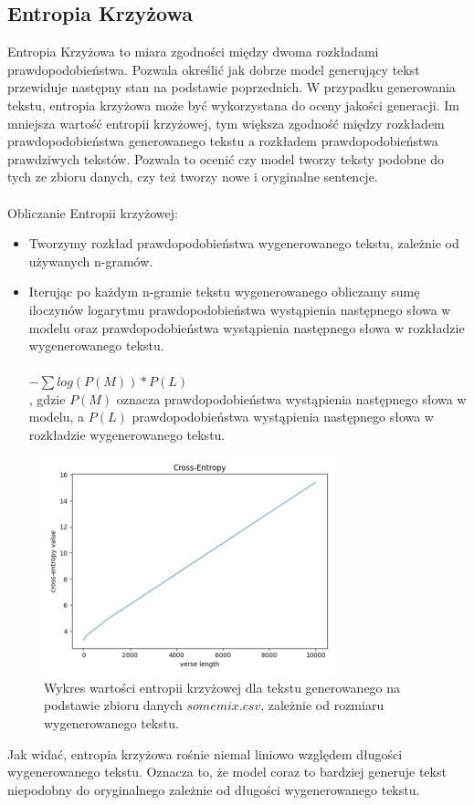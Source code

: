 \documentclass{article}
\begin{document}
\subsection{Entropia Krzyżowa}
Entropia Krzyżowa to miara zgodności między dwoma rozkładami prawdopodobieństwa. Pozwala określić jak dobrze model generujący tekst przewiduje następny stan na podstawie poprzednich. W przypadku generowania tekstu, entropia krzyżowa może być wykorzystana do oceny jakości generacji. Im mniejsza wartość entropii krzyżowej, tym większa zgodność między rozkładem prawdopodobieństwa generowanego tekstu a rozkładem prawdopodobieństwa prawdziwych tekstów. Pozwala to ocenić czy model tworzy teksty podobne do tych ze zbioru danych, czy też tworzy nowe i oryginalne sentencje.
\\\\
Obliczanie Entropii krzyżowej:
\begin{itemize}
    \item Tworzymy rozkład prawdopodobieństwa wygenerowanego tekstu, zależnie od używanych n-gramów.
    \item Iterując po każdym n-gramie tekstu wygenerowanego obliczamy sumę iloczynów logarytmu prawdopodobieństwa wystąpienia następnego słowa w modelu oraz prawdopodobieństwa wystąpienia następnego słowa w rozkładzie wygenerowanego tekstu. \\\\ $-\sum log(P(M)) * P(L)$ \\ , gdzie $P(M)$ oznacza prawdopodobieństwa wystąpienia następnego słowa w modelu, a $P(L)$ prawdopodobieństwa wystąpienia następnego słowa w rozkładzie wygenerowanego tekstu.
\end{itemize}
\begin{figure}[h]
    \centering
    \includegraphics[width=0.75\textwidth]{cross-entropy}
    \caption{Wykres wartości entropii krzyżowej dla tekstu generowanego na podstawie zbioru danych $somemix.csv$, zależnie od rozmiaru wygenerowanego tekstu.}
    \label{fig:mesh1}
\end{figure}
\FloatBarrier
Jak widać, entropia krzyżowa rośnie niemal liniowo względem długości wygenerowanego tekstu. Oznacza to, że model coraz to bardziej generuje tekst niepodobny do oryginalnego zależnie od długości wygenerowanego tekstu.
\end{document}
